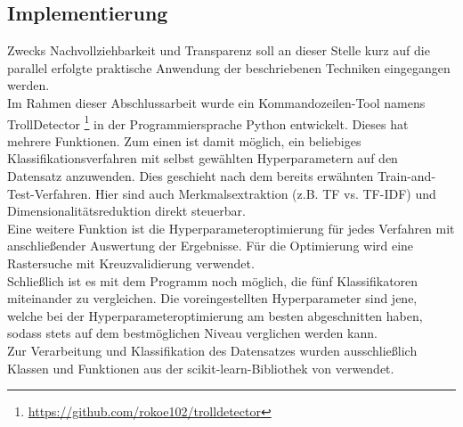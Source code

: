 \subsection{Implementierung} 
Zwecks Nachvollziehbarkeit und Transparenz soll an dieser Stelle kurz auf die parallel erfolgte praktische Anwendung der beschriebenen Techniken eingegangen werden.\\
Im Rahmen dieser Abschlussarbeit wurde ein Kommandozeilen-Tool namens \glqq TrollDetector\grqq{} \footnote{\url{https://github.com/rokoe102/trolldetector}} in der Programmiersprache Python entwickelt. Dieses hat mehrere Funktionen. Zum einen ist damit möglich, ein beliebiges Klassifikationsverfahren mit selbst gewählten Hyperparametern auf den Datensatz anzuwenden. Dies geschieht nach dem bereits erwähnten \glqq Train-and-Test\grqq-Verfahren. Hier sind auch Merkmalsextraktion (z.B. TF vs. TF-IDF) und Dimensionalitätsreduktion direkt steuerbar.\\
Eine weitere Funktion ist die Hyperparameteroptimierung für jedes Verfahren mit anschließender Auswertung der Ergebnisse. Für die Optimierung wird eine Rastersuche mit Kreuzvalidierung verwendet.\\
Schließlich ist es mit dem Programm noch möglich, die fünf Klassifikatoren miteinander zu vergleichen. Die voreingestellten Hyperparameter sind jene, welche bei der Hyperparameteroptimierung am besten abgeschnitten haben, sodass stets auf dem bestmöglichen Niveau verglichen werden kann.\\
Zur Verarbeitung und Klassifikation des Datensatzes wurden ausschließlich Klassen und Funktionen aus der \glqq scikit-learn\grqq-Bibliothek von \citet{scikit-learn} verwendet.\\
\pagebreak